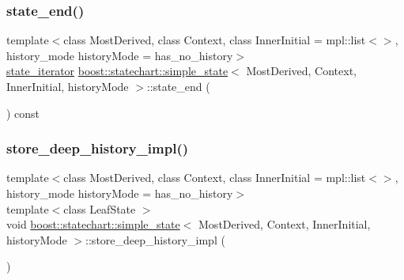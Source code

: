 \mbox{\label{classboost_1_1statechart_1_1simple__state_a831e44d8bb7aa3f0f9a46df96de9099b}} 
\subsubsection{\texorpdfstring{state\+\_\+end()}{state\_end()}}
{\footnotesize\ttfamily template$<$class Most\+Derived, class Context, class Inner\+Initial = mpl\+::list$<$$>$, history\+\_\+mode history\+Mode = has\+\_\+no\+\_\+history$>$ \\
\mbox{\hyperlink{classboost_1_1statechart_1_1simple__state_a32d30bbceb41ad02b70016d8530722a1}{state\+\_\+iterator}} \mbox{\hyperlink{classboost_1_1statechart_1_1simple__state}{boost\+::statechart\+::simple\+\_\+state}}$<$ Most\+Derived, Context, Inner\+Initial, history\+Mode $>$\+::state\+\_\+end (\begin{DoxyParamCaption}{ }\end{DoxyParamCaption}) const\hspace{0.3cm}{\ttfamily [inline]}}

\mbox{\label{classboost_1_1statechart_1_1simple__state_a5d962dfc41522b59250e71ae5f01c30a}} 
\subsubsection{\texorpdfstring{store\+\_\+deep\+\_\+history\+\_\+impl()}{store\_deep\_history\_impl()}}
{\footnotesize\ttfamily template$<$class Most\+Derived, class Context, class Inner\+Initial = mpl\+::list$<$$>$, history\+\_\+mode history\+Mode = has\+\_\+no\+\_\+history$>$ \\
template$<$class Leaf\+State $>$ \\
void \mbox{\hyperlink{classboost_1_1statechart_1_1simple__state}{boost\+::statechart\+::simple\+\_\+state}}$<$ Most\+Derived, Context, Inner\+Initial, history\+Mode $>$\+::store\+\_\+deep\+\_\+history\+\_\+impl (\begin{DoxyParamCaption}{ }\end{DoxyParamCaption})\hspace{0.3cm}{\ttfamily [inline]}}

